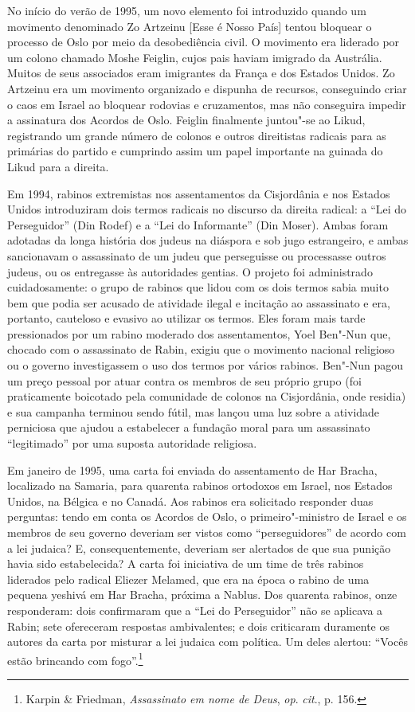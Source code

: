 No início do verão de 1995, um novo elemento foi introduzido quando um
movimento denominado Zo Artzeinu {[}Esse é Nosso País{]} tentou bloquear o
processo de Oslo por meio da desobediência civil. O movimento era
liderado por um colono chamado Moshe Feiglin, cujos pais haviam imigrado
da Austrália. Muitos de seus associados eram imigrantes da França e dos
Estados Unidos. Zo Artzeinu era um movimento organizado e dispunha de
recursos, conseguindo criar o caos em Israel ao bloquear rodovias e
cruzamentos, mas não conseguira impedir a assinatura dos Acordos
de Oslo. Feiglin finalmente juntou"-se ao Likud, registrando um grande
número de colonos e outros direitistas radicais para as primárias do
partido e cumprindo assim um papel importante na guinada do Likud para a
direita.

Em 1994, rabinos extremistas nos assentamentos da Cisjordânia e nos
Estados Unidos introduziram dois termos radicais no discurso da direita
radical: a ``Lei do Perseguidor'' (Din Rodef) e a ``Lei do Informante''
(Din Moser). Ambas foram adotadas da longa história dos judeus na
diáspora e sob jugo estrangeiro, e ambas sancionavam o assassinato de um
judeu que perseguisse ou processasse outros judeus, ou os entregasse às
autoridades gentias. O projeto foi administrado cuidadosamente: o grupo
de rabinos que lidou com os dois termos sabia muito bem que podia ser
acusado de atividade ilegal e incitação ao assassinato e era, portanto,
cauteloso e evasivo ao utilizar os termos. Eles foram mais tarde
pressionados por um rabino moderado dos assentamentos, Yoel Ben"-Nun que,
chocado com o assassinato de Rabin, exigiu que o movimento nacional
religioso ou o governo investigassem o uso dos termos por vários
rabinos. Ben"-Nun pagou um preço pessoal por atuar contra os membros de
seu próprio grupo (foi praticamente boicotado pela comunidade de colonos
na Cisjordânia, onde residia) e sua campanha terminou sendo fútil, mas
lançou uma luz sobre a atividade perniciosa que ajudou a estabelecer a
fundação moral para um assassinato ``legitimado'' por uma suposta
autoridade religiosa.

Em janeiro de 1995, uma carta foi enviada do assentamento de Har Bracha,
localizado na Samaria, para quarenta rabinos ortodoxos em Israel, nos
Estados Unidos, na Bélgica e no Canadá. Aos rabinos era solicitado
responder duas perguntas: tendo em conta os Acordos de Oslo, o primeiro"-ministro
de Israel e os membros de seu governo deveriam ser vistos como
``perseguidores'' de acordo com a lei judaica? E, consequentemente,
deveriam ser alertados de que sua punição havia sido estabelecida? A
carta foi iniciativa de um time de três rabinos liderados pelo radical
Eliezer Melamed, que era na época o rabino de uma pequena yeshivá em Har
Bracha, próxima a Nablus. Dos quarenta rabinos, onze responderam: dois
confirmaram que a ``Lei do Perseguidor'' não se aplicava a Rabin; sete
ofereceram respostas ambivalentes; e dois criticaram duramente os
autores da carta por misturar a lei judaica com política. Um deles
alertou: ``Vocês estão brincando com fogo''.\footnote{Karpin \& Friedman, 
\textit{Assassinato em nome de Deus}, \textit{op}. \textit{cit}., p. 156.}

